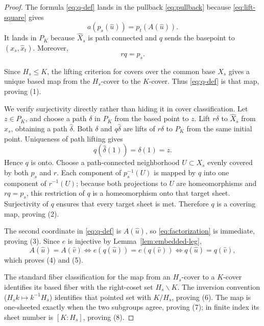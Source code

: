 \documentclass[11pt,reqno]{amsart}
\theoremstyle{definition}
\theoremstyle{remark}
\begin{document}
\begin{proof}
The formula \eqref{eq:q-def} lands in the pullback \eqref{eq:pullback} because \eqref{eq:lift-square} gives
\[
  a(p_s(\widehat u))=p_t(A(\widehat u)).
\]
It lands in \( P_K \) because \( \widehat X_s \) is path connected and \( q \) sends the basepoint to \( (x_s,\widehat x_t) \).  Moreover,
\begin{equation}\label{eq:rq}
  r q = p_s .
\end{equation}

Since \( H_s\leq K \), the lifting criterion for covers over the common base \( X_s \) gives a unique based map from the \( H_s \)-cover to the \( K \)-cover.  Thus \eqref{eq:q-def} is that map, proving (1).

We verify surjectivity directly rather than hiding it in cover classification.  Let \( z\in P_K \), and choose a path \( \delta \) in \( P_K \) from the based point to \( z \).  Lift \( r\delta \) to \( \widehat X_s \) from \( \widehat x_s \), obtaining a path \( \widehat\delta \).  Both \( \delta \) and \( q\widehat\delta \) are lifts of \( r\delta \) to \( P_K \) from the same initial point.  Uniqueness of path lifting gives
\[
  q(\widehat\delta(1))=\delta(1)=z .
\]
Hence \( q \) is onto.  Choose a path-connected neighborhood \( U\subset X_s \) evenly covered by both \( p_s \) and \( r \).  Each component of \( p_s^{-1}(U) \) is mapped by \( q \) into one component of \( r^{-1}(U) \); because both projections to \( U \) are homeomorphisms and \( rq=p_s \), this restriction of \( q \) is a homeomorphism onto that target sheet.  Surjectivity of \( q \) ensures that every target sheet is met.  Therefore \( q \) is a covering map, proving (2).

The second coordinate in \eqref{eq:q-def} is \( A(\widehat u) \), so \eqref{eq:factorization} is immediate, proving (3).  Since \( e \) is injective by Lemma~\ref{lem:embedded-leg},
\[
  A(\widehat u)=A(\widehat v)
  \iff
  e(q(\widehat u))=e(q(\widehat v))
  \iff
  q(\widehat u)=q(\widehat v),
\]
which proves (4) and (5).

The standard fiber classification for the map from an \( H_s \)-cover to a \( K \)-cover identifies its based fiber with the right-coset set \( H_s\backslash K \).  The inversion convention (\( H_sk\mapsto k^{-1}H_s \)) identifies that pointed set with \( K/H_s \), proving (6).  The map is one-sheeted exactly when the two subgroups agree, proving (7); in finite index its sheet number is \( [K:H_s] \), proving (8).
\end{proof}
\end{document}
